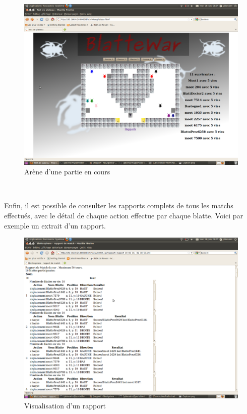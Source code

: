 ~
    
    \begin{figure}[h!]
\begin{center}
\includegraphics[width=.8\linewidth]{images/screenshot1.png}
\caption{Arène d'une partie en cours}
\end{center}
\end{figure}

    ~
    
    Enfin, il est possible de consulter les rapports complets de tous les matchs effectués, avec le détail de chaque action effectue par chaque blatte. Voici par exemple un extrait d'un rapport.
    
   \begin{figure}[h!]
\begin{center}
\includegraphics[width=.8\linewidth]{images/screenshot2.png}
\caption{Visualisation d'un rapport}
\end{center}
\end{figure}

 
